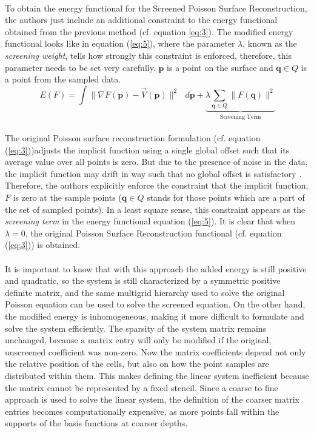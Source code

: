 \documentclass[12pt,a4paper]{article}
\begin{document}
\paragraph{}To obtain the energy functional for the Screened Poisson Surface Reconstruction, the authors just include an additional constraint to the energy functional obtained from the previous method (cf. equation \ref{eq:3}). The modified energy functional looks like in equation (\ref{eq:5}), where the parameter $\lambda$, known as the \textit{screening weight}, tells how strongly this constraint is enforced, therefore, this parameter needs to be set very carefully. $\mathbf{p}$ is a point on the surface and $\mathbf{q} \in Q$ is a point from the sampled data.
\begin{equation}
\label{eq:5}
E(F) = \int \| \nabla F(\mathbf{p}) - \vec{V}(\mathbf{p}) \|^2 \mbox{ }d\mathbf{p} +  \underbrace{\lambda \sum_{\mathbf{q} \in Q} \| F(\mathbf{q}) \|^2}_\text{Screening Term}
\end{equation}
\paragraph{}The original Poisson surface reconstruction formulation (cf. equation (\ref{eq:3}))adjusts the implicit function using a single global offset such that its average value over all points is zero. But due to the presence of noise in the data, the implicit function may drift in way such that no global offset is satisfactory \cite{ScreenedPoisson}. Therefore, the authors explicitly enforce the constraint that the implicit function, $F$ is zero at the sample points ($\mathbf{q} \in Q$ stands for those points which are a part of the set of sampled points). In a least square sense, this constraint appears as the \textit{screening term} in the energy functional equation (\ref{eq:5}). It is clear that when $\lambda = 0$, the original Poisson Surface Reconstruction functional (cf. equation (\ref{eq:3})) is obtained.

\paragraph{}
It is important to know that with this approach the added energy is still positive and quadratic, so the system is still characterized by a symmetric positive definite matrix, and the same multigrid hierarchy used to solve the original Poisson equation can be used to solve the screened equation. On the other hand, the modified energy is inhomogeneous, making it more difficult to formulate and solve the system efficiently. The sparsity of the system matrix remains unchanged, because a matrix entry will only be modified if the original, unscreened coefficient was non-zero. Now the matrix coefficients depend not only the relative position of the cells, but also on how the point samples are distributed within them.
This makes defining the linear system inefficient because the matrix cannot be represented by a fixed stencil. Since a coarse to fine approach is used to solve the linear system, the definition of the coarser matrix entries becomes computationally expensive, as more points fall within the supports of the basis functions at coarser depths.
\end{document}
